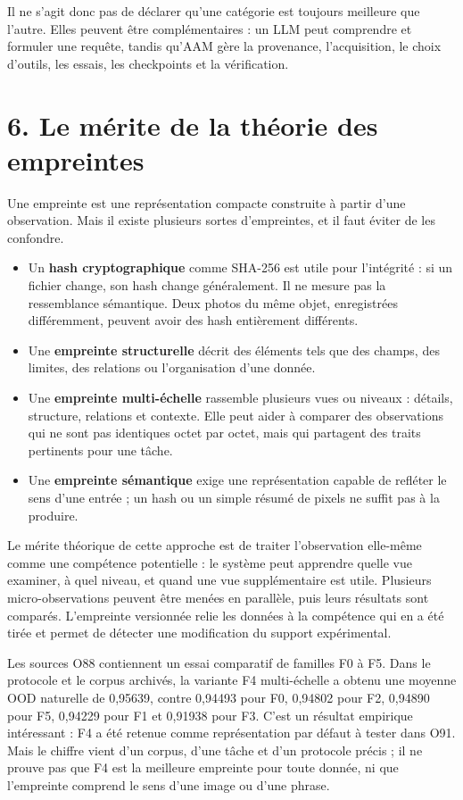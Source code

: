 \documentclass[11pt,a4paper]{article}
\begin{document}
Il ne s'agit donc pas de déclarer qu'une catégorie est toujours meilleure que l'autre. Elles peuvent être complémentaires : un LLM peut comprendre et formuler une requête, tandis qu'AAM gère la provenance, l'acquisition, le choix d'outils, les essais, les checkpoints et la vérification.

\section*{6. Le mérite de la théorie des empreintes}

Une empreinte est une représentation compacte construite à partir d'une observation. Mais il existe plusieurs sortes d'empreintes, et il faut éviter de les confondre.

\begin{itemize}
\item Un \textbf{hash cryptographique} comme SHA-256 est utile pour l'intégrité : si un fichier change, son hash change généralement. Il ne mesure pas la ressemblance sémantique. Deux photos du même objet, enregistrées différemment, peuvent avoir des hash entièrement différents.
\item Une \textbf{empreinte structurelle} décrit des éléments tels que des champs, des limites, des relations ou l'organisation d'une donnée.
\item Une \textbf{empreinte multi-échelle} rassemble plusieurs vues ou niveaux : détails, structure, relations et contexte. Elle peut aider à comparer des observations qui ne sont pas identiques octet par octet, mais qui partagent des traits pertinents pour une tâche.
\item Une \textbf{empreinte sémantique} exige une représentation capable de refléter le sens d'une entrée ; un hash ou un simple résumé de pixels ne suffit pas à la produire.
\end{itemize}

Le mérite théorique de cette approche est de traiter l'observation elle-même comme une compétence potentielle : le système peut apprendre quelle vue examiner, à quel niveau, et quand une vue supplémentaire est utile. Plusieurs micro-observations peuvent être menées en parallèle, puis leurs résultats sont comparés. L'empreinte versionnée relie les données à la compétence qui en a été tirée et permet de détecter une modification du support expérimental.

Les sources O88 contiennent un essai comparatif de familles F0 à F5. Dans le protocole et le corpus archivés, la variante F4 multi-échelle a obtenu une moyenne OOD naturelle de 0,95639, contre 0,94493 pour F0, 0,94802 pour F2, 0,94890 pour F5, 0,94229 pour F1 et 0,91938 pour F3. C'est un résultat empirique intéressant : F4 a été retenue comme représentation par défaut à tester dans O91. Mais le chiffre vient d'un corpus, d'une tâche et d'un protocole précis ; il ne prouve pas que F4 est la meilleure empreinte pour toute donnée, ni que l'empreinte comprend le sens d'une image ou d'une phrase.
\end{document}
